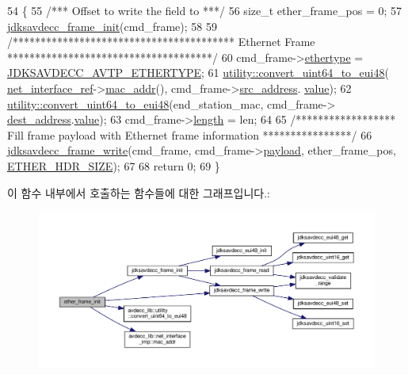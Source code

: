 \begin{DoxyCode}
54 \{
55     \textcolor{comment}{/*** Offset to write the field to ***/}
56     \textcolor{keywordtype}{size\_t} ether\_frame\_pos = 0;
57     \hyperlink{group__frame_ga14d8effbd6816c69743c5be3e98fea27}{jdksavdecc\_frame\_init}(cmd\_frame);
58 
59     \textcolor{comment}{/**************************************** Ethernet Frame *************************************/}
60     cmd\_frame->\hyperlink{structjdksavdecc__frame_aa9296c58dc24c63c4ee927db394a97d7}{ethertype} = \hyperlink{group__pdu_ga9fe7bd6b7d7b0f92f5fdbb910068197f}{JDKSAVDECC\_AVTP\_ETHERTYPE};
61     \hyperlink{namespaceavdecc__lib_1_1utility_a723fa51b0a25cbec764d4e7fa1f5daac}{utility::convert\_uint64\_to\_eui48}(
      \hyperlink{namespaceavdecc__lib_adb4da03bc65b7846cc240ee919bbde19}{net\_interface\_ref}->\hyperlink{classavdecc__lib_1_1net__interface__imp_a742e975c065f9067f42182847df080da}{mac\_addr}(), cmd\_frame->\hyperlink{structjdksavdecc__frame_a74855d22d112da72f29ba4959ebc639b}{src\_address}.
      \hyperlink{structjdksavdecc__eui48_a18b93f04637cf37688ec10a33a0cbc26}{value});
62     \hyperlink{namespaceavdecc__lib_1_1utility_a723fa51b0a25cbec764d4e7fa1f5daac}{utility::convert\_uint64\_to\_eui48}(end\_station\_mac, cmd\_frame->
      \hyperlink{structjdksavdecc__frame_a104d37031c593f66765dc66d8ac8962b}{dest\_address}.\hyperlink{structjdksavdecc__eui48_a18b93f04637cf37688ec10a33a0cbc26}{value});
63     cmd\_frame->\hyperlink{structjdksavdecc__frame_a1892eba2086d12ac2b09005aeb09ea3b}{length} = len;
64 
65     \textcolor{comment}{/****************** Fill frame payload with Ethernet frame information ****************/}
66     \hyperlink{group__frame_gaba1e860c060886e82198907b17214aee}{jdksavdecc\_frame\_write}(cmd\_frame, cmd\_frame->\hyperlink{structjdksavdecc__frame_a220ad076814a31ae0163e722e523de46}{payload}, ether\_frame\_pos, 
      \hyperlink{namespaceavdecc__lib_a6c827b1a0d973e18119c5e3da518e65ca9512ad9b34302ba7048d88197e0a2dc0}{ETHER\_HDR\_SIZE});
67 
68     \textcolor{keywordflow}{return} 0;
69 \}
\end{DoxyCode}


이 함수 내부에서 호출하는 함수들에 대한 그래프입니다.\+:
\nopagebreak
\begin{figure}[H]
\begin{center}
\leavevmode
\includegraphics[width=350pt]{classavdecc__lib_1_1aecp__controller__state__machine_a86ff947c5e6b799cfb877d3767bfa1f9_cgraph}
\end{center}
\end{figure}




